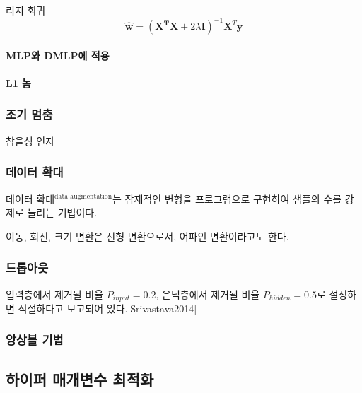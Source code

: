 \documentclass [12pt] {oblivoir}
\let\oldsubsubsection=\subsubsection
\renewcommand{\subsubsection}
{
  \filbreak
  \oldsubsubsection
}
\begin{document}
리지 회귀
\begin{equation} \tag{5.29}
  \mathbf{\hat{w}} = (\mathbf{X^{T}X} + 2\lambda \mathbf{I})^{-1}\mathbf{X}^{T}\mathbf{y}
\end{equation}

\vspace{3mm}

\paragraph*{MLP와 DMLP에 적용}\mbox{}

\vspace{3mm}

\paragraph*{L1 놈}\mbox{}

\vspace{3mm}

\subsubsection{조기 멈춤}

참을성 인자

\subsubsection{데이터 확대}

데이터 확대$^{\text{data augmentation}}$는 잠재적인 변형을 프로그램으로 구현하여 샘플의 수를 강제로 늘리는 기법이다.

이동, 회전, 크기 변환은 선형 변환으로서, 어파인 변환이라고도 한다.

\subsubsection{드롭아웃}

입력층에서 제거될 비율 $P_{input} = 0.2$, 은닉층에서 제거될 비율 $P_{hidden} = 0.5$로 설정하면 적절하다고 보고되어 있다.[Srivastava2014]

\subsubsection{앙상블 기법}

\subsection{하이퍼 매개변수 최적화}
\end{document}
